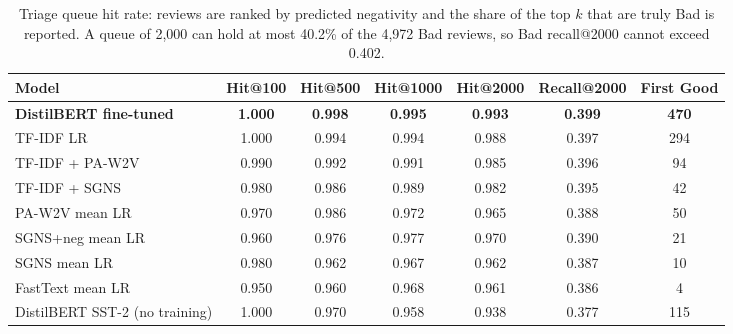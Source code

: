 \begin{table}[H]
\centering
\footnotesize
\caption{Triage queue hit rate: reviews are ranked by predicted negativity and the share of the top $k$ that are truly Bad is reported. A queue of 2,000 can hold at most 40.2\% of the 4,972 Bad reviews, so Bad recall@2000 cannot exceed 0.402.}
\label{tab:sentqueue}
\begin{tabular}{lcccccc}
\toprule
Model & Hit@100 & Hit@500 & Hit@1000 & Hit@2000 & Recall@2000 & First Good \\
\midrule
\textbf{DistilBERT fine-tuned} & \textbf{1.000} & \textbf{0.998} & \textbf{0.995} & \textbf{0.993} & \textbf{0.399} & \textbf{470} \\
TF-IDF LR & 1.000 & 0.994 & 0.994 & 0.988 & 0.397 & 294 \\
TF-IDF + PA-W2V & 0.990 & 0.992 & 0.991 & 0.985 & 0.396 & 94 \\
TF-IDF + SGNS & 0.980 & 0.986 & 0.989 & 0.982 & 0.395 & 42 \\
PA-W2V mean LR & 0.970 & 0.986 & 0.972 & 0.965 & 0.388 & 50 \\
SGNS+neg mean LR & 0.960 & 0.976 & 0.977 & 0.970 & 0.390 & 21 \\
SGNS mean LR & 0.980 & 0.962 & 0.967 & 0.962 & 0.387 & 10 \\
FastText mean LR & 0.950 & 0.960 & 0.968 & 0.961 & 0.386 & 4 \\
DistilBERT SST-2 (no training) & 1.000 & 0.970 & 0.958 & 0.938 & 0.377 & 115 \\
\bottomrule
\end{tabular}
\end{table}